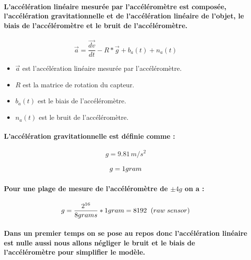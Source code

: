 \paragraph{L'accélération linéaire mesurée par l'accéléromètre est composée, l'accélération gravitationnelle et de l'accélération linéaire de l'objet, le biais de l'accéléromètre et le bruit de l'accéléromètre.}

\begin{equation}
	\vec{a} = \frac{\vec{dv}}{dt} - R * \vec{g} + b_a(t) + n_a(t)
\end{equation}

\begin{itemize}
	\item $\vec{a}$ est l'accélération linéaire mesurée par l'accéléromètre.
	\item $R$ est la matrice de rotation du capteur.
	\item $b_a(t)$ est le biais de l'accéléromètre.
	\item $n_a(t)$ est le bruit de l'accéléromètre.
\end{itemize}

\paragraph{L'accélération gravitationnelle est définie comme :}
\begin{equation*}
	g = 9.81 \, m/s^2
\end{equation*}

\begin{equation*}
	g = 1 gram\\
\end{equation*}

\paragraph*{Pour une plage de mesure de l'accéléromètre de $\pm 4g$ on a :}

\begin{equation*}
	g = \frac{2^{16}}{8grams} * 1gram = 8192\hspace*{.2cm}(raw\hspace*{.1cm}sensor)
\end{equation*}



\paragraph{Dans un premier temps on se pose au repos donc l'accélération linéaire est nulle aussi nous allons négliger le bruit et le biais de l'accéléromètre pour simplifier le modèle.}

